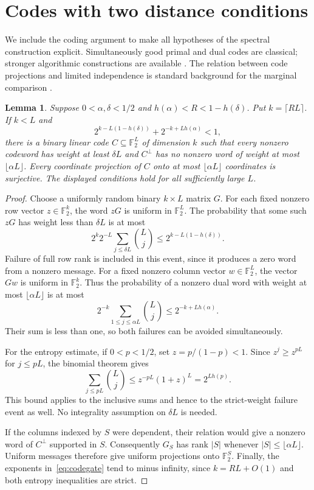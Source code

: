 \documentclass[11pt]{article}
\newtheorem{lemma}[theorem]{Lemma}
\newcommand{\F}{\mathbb F}
\begin{document}
\section{Codes with two distance conditions}
We include the coding argument to make all hypotheses of the spectral
construction explicit. Simultaneously good primal and dual codes are
classical; stronger algorithmic constructions are available
\cite{BrehmResch}. The relation between code projections and limited
independence is standard background for the marginal comparison
\cite{AGM}.

\begin{lemma}\label{lem:code}
Suppose $0<\alpha,\delta<1/2$ and
$h(\alpha)<R<1-h(\delta)$. Put $k=\lceil RL\rceil$.
If $k<L$ and
\begin{equation}\label{eq:codegate}
 2^{k-L(1-h(\delta))}+2^{-k+Lh(\alpha)}<1,
\end{equation}
there is a binary linear code $C\subseteq\F_2^L$ of dimension $k$
such that every nonzero codeword has weight at least $\delta L$ and
$C^\perp$ has no nonzero word of weight at most $\lfloor\alpha L\rfloor$.
Every coordinate projection of $C$ onto at most $\lfloor\alpha L\rfloor$
coordinates is surjective. The displayed conditions hold for all
sufficiently large $L$.
\end{lemma}
\begin{proof}
Choose a uniformly random binary $k\times L$ matrix $G$. For each fixed
nonzero row vector $z\in\F_2^k$, the word $zG$ is uniform in $\F_2^L$.
The probability that some such $zG$ has weight less than $\delta L$ is
at most
\[
 2^k2^{-L}\sum_{j\le\delta L}\binom Lj
       \le 2^{k-L(1-h(\delta))}.
\]
Failure of full row rank is included in this event, since it produces
a zero word from a nonzero message. For a fixed nonzero column vector
$w\in\F_2^L$, the vector $Gw$ is uniform in $\F_2^k$. Thus the probability
of a nonzero dual word with weight at most $\lfloor\alpha L\rfloor$ is
at most
\[
 2^{-k}\sum_{1\le j\le\alpha L}\binom Lj
       \le 2^{-k+Lh(\alpha)}.
\]
Their sum is less than one, so both failures can be avoided simultaneously.

For the entropy estimate, if $0<p<1/2$, set $z=p/(1-p)<1$. Since
$z^j\ge z^{pL}$ for $j\le pL$, the binomial theorem gives
\[
 \sum_{j\le pL}\binom Lj\le z^{-pL}(1+z)^L=2^{Lh(p)}.
\]
This bound applies to the inclusive sums and hence to the strict-weight
failure event as well. No integrality assumption on $\delta L$ is needed.

If the columns indexed by $S$ were dependent, their relation would give
a nonzero word of $C^\perp$ supported in $S$. Consequently $G_S$ has
rank $|S|$ whenever $|S|\le\lfloor\alpha L\rfloor$. Uniform messages
therefore give uniform projections onto $\F_2^S$. Finally, the exponents
in~\eqref{eq:codegate} tend to minus infinity, since $k=RL+O(1)$ and
both entropy inequalities are strict.
\end{proof}
\end{document}
